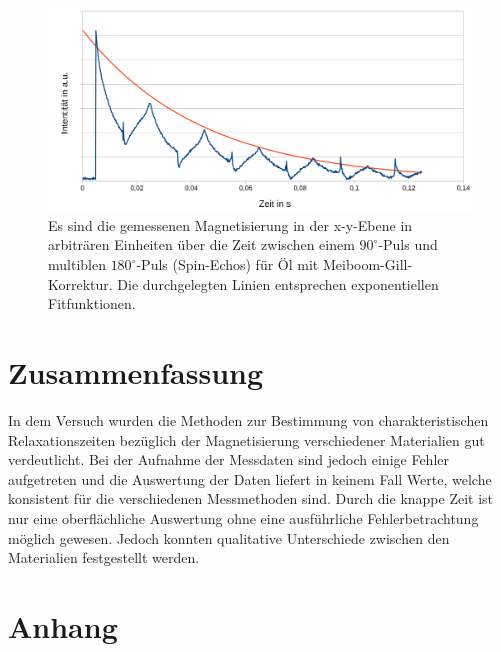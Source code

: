 \documentclass[numbers=noenddot,a4paper,notitlepage,twoside,BCOR15mm]{scrartcl}
\begin{document}
	\begin{figure}[h]
		\centering
		\includegraphics[width=1\textwidth]{pics/T2_Oel_MG}
		\caption{Es sind die gemessenen Magnetisierung in der x-y-Ebene in arbiträren Einheiten über die Zeit zwischen einem $90^\circ$-Puls und multiblen $180^\circ$-Puls (Spin-Echos) für Öl mit Meiboom-Gill-Korrektur. Die durchgelegten Linien entsprechen exponentiellen Fitfunktionen.}
		\label{abb:T2_Oel_MG}
	\end{figure}

	\section{Zusammenfassung}
	
	In dem Versuch wurden die Methoden zur Bestimmung von charakteristischen Relaxationszeiten bezüglich der Magnetisierung verschiedener Materialien gut verdeutlicht. Bei der Aufnahme der Messdaten sind jedoch einige Fehler aufgetreten und die Auswertung der Daten liefert in keinem Fall Werte, welche konsistent für die verschiedenen Messmethoden sind. Durch die knappe Zeit ist nur eine oberflächliche Auswertung ohne eine ausführliche Fehlerbetrachtung möglich gewesen. Jedoch konnten qualitative Unterschiede zwischen den Materialien festgestellt werden.
	
	\clearpage
	\section{Anhang}

		
		
\end{document}

